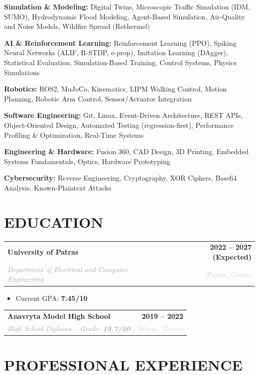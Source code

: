 \documentclass[10pt, a4paper]{article}
\makeatletter
\newcommand{\cvitem}[4]{
    \noindent
    \begin{tabularx}{\textwidth}{@{}X r@{}}
        \textbf{#1} & \textcolor{primary}{\textbf{#2}} \\
        \textit{\textcolor{darkgray}{#3}} & \textcolor{lightgray}{\small #4} \\
    \end{tabularx}
    \vspace{2pt}
}
\makeatother
\begin{document}
\vspace{0.1em}\noindent
\textbf{Simulation \& Modeling:}
Digital Twins, Microscopic Traffic Simulation (IDM, SUMO), Hydrodynamic Flood Modeling, Agent-Based Simulation, Air-Quality and Noise Models, Wildfire Spread (Rothermel)

\vspace{0.1em}\noindent
\textbf{AI \& Reinforcement Learning:}
Reinforcement Learning (PPO), Spiking Neural Networks (ALIF, R-STDP, e-prop), Imitation Learning (DAgger), Statistical Evaluation, Simulation-Based Training, Control Systems, Physics Simulations

\vspace{0.1em}\noindent
\textbf{Robotics:}
ROS2, MuJoCo, Kinematics, LIPM Walking Control, Motion Planning, Robotic Arm Control, Sensor/Actuator Integration

\vspace{0.1em}\noindent
\textbf{Software Engineering:}
Git, Linux, Event-Driven Architecture, REST APIs, Object-Oriented Design, Automated Testing (regression-first), Performance Profiling \& Optimization, Real-Time Systems

\vspace{0.1em}\noindent
\textbf{Engineering \& Hardware:}
Fusion 360, CAD Design, 3D Printing, Embedded Systems Fundamentals, Optics, Hardware Prototyping

\vspace{0.1em}\noindent
\textbf{Cybersecurity:}
Reverse Engineering, Cryptography, XOR Ciphers, Base64 Analysis, Known-Plaintext Attacks


\section*{EDUCATION}

\cvitem
{University of Patras}
{2022 -- 2027 (Expected)}
{Department of Electrical and Computer Engineering}
{Patras, Greece}

\begin{itemize}[leftmargin=1.2em, topsep=0pt, itemsep=1pt]
    \item Current GPA: \textbf{7.45/10}
\end{itemize}

\vspace{0.35em}

\cvitem
{Anavryta Model High School}
{2019 -- 2022}
{High School Diploma -- Grade: \textbf{19.7/20}}
{Athens, Greece}

\section*{PROFESSIONAL EXPERIENCE}
\end{document}
